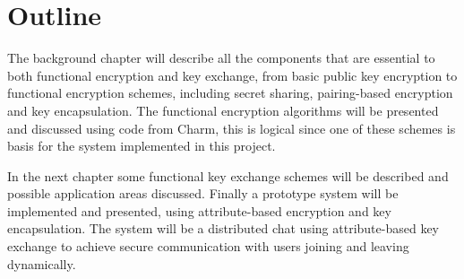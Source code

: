 \section{Outline}\label{sec:outline}
The background chapter will describe all the components that are essential to both functional encryption and key exchange, from basic public key encryption to functional encryption schemes, including secret sharing, pairing-based encryption and key encapsulation. The functional encryption algorithms will be presented and discussed using code from Charm, this is logical since one of these schemes is basis for the system implemented in this project. 
\par In the next chapter some functional key exchange schemes will be described and possible application areas discussed. Finally a prototype system will be implemented and presented, using attribute-based encryption and key encapsulation. The system will be a distributed chat using attribute-based key exchange to achieve secure communication with users joining and leaving dynamically.
